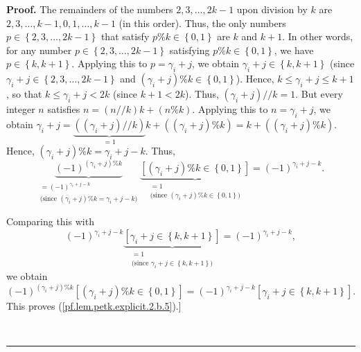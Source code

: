 \documentclass[numbers=enddot,12pt,final,onecolumn,notitlepage]{scrartcl}%
\theoremstyle{definition}
\newenvironment{proof}[1][Proof]{\noindent\textbf{#1.} }{\ \rule{0.5em}{0.5em}}
\newenvironment{verlong}{}{}
\begin{document}
\begin{proof}
\begin{verlong}
The remainders of the numbers $2,3,\ldots,2k-1$ upon division by $k$ are
$2,3,\ldots,k-1,0,1,\ldots,k-1$ (in this order). Thus, the only numbers
$p\in\left\{  2,3,\ldots,2k-1\right\}  $ that satisfy $p\%k\in\left\{
0,1\right\}  $ are $k$ and $k+1$. In other words, for any number $p\in\left\{
2,3,\ldots,2k-1\right\}  $ satisfying $p\%k\in\left\{  0,1\right\}  $, we have
$p\in\left\{  k,k+1\right\}  $. Applying this to $p=\gamma_{i}+j$, we obtain
$\gamma_{i}+j\in\left\{  k,k+1\right\}  $ (since $\gamma_{i}+j\in\left\{
2,3,\ldots,2k-1\right\}  $ and $\left(  \gamma_{i}+j\right)  \%k\in\left\{
0,1\right\}  $). Hence, $k\leq\gamma_{i}+j\leq k+1$, so that $k\leq\gamma
_{i}+j<2k$ (since $k+1<2k$). Thus, $\left(  \gamma_{i}+j\right)  //k=1$. But
every integer $n$ satisfies $n=\left(  n//k\right)  k+\left(  n\%k\right)  $.
Applying this to $n=\gamma_{i}+j$, we obtain $\gamma_{i}+j=\underbrace{\left(
\left(  \gamma_{i}+j\right)  //k\right)  }_{=1}k+\left(  \left(  \gamma
_{i}+j\right)  \%k\right)  =k+\left(  \left(  \gamma_{i}+j\right)  \%k\right)
$. Hence, $\left(  \gamma_{i}+j\right)  \%k=\gamma_{i}+j-k$. Thus,%
\[
\underbrace{\left(  -1\right)  ^{\left(  \gamma_{i}+j\right)  \%k}%
}_{\substack{=\left(  -1\right)  ^{\gamma_{i}+j-k}\\\text{(since }\left(
\gamma_{i}+j\right)  \%k=\gamma_{i}+j-k\text{)}}}\underbrace{\left[  \left(
\gamma_{i}+j\right)  \%k\in\left\{  0,1\right\}  \right]  }%
_{\substack{=1\\\text{(since }\left(  \gamma_{i}+j\right)  \%k\in\left\{
0,1\right\}  \text{)}}}=\left(  -1\right)  ^{\gamma_{i}+j-k}.
\]

\end{verlong}

\noindent Comparing this with%
\[
\left(  -1\right)  ^{\gamma_{i}+j-k}\underbrace{\left[  \gamma_{i}%
+j\in\left\{  k,k+1\right\}  \right]  }_{\substack{=1\\\text{(since }%
\gamma_{i}+j\in\left\{  k,k+1\right\}  \text{)}}}=\left(  -1\right)
^{\gamma_{i}+j-k},
\]
we obtain%
\[
\left(  -1\right)  ^{\left(  \gamma_{i}+j\right)  \%k}\left[  \left(
\gamma_{i}+j\right)  \%k\in\left\{  0,1\right\}  \right]  =\left(  -1\right)
^{\gamma_{i}+j-k}\left[  \gamma_{i}+j\in\left\{  k,k+1\right\}  \right]  .
\]
This proves (\ref{pf.lem.petk.explicit.2.b.5}).]


\end{proof}
\end{document}
